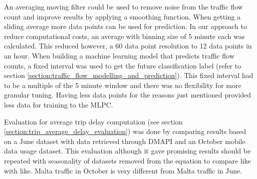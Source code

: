 \documentclass[12pt, a4paper]{report}
\theoremstyle{definition}
\theoremstyle{definition}%
\theoremstyle{definition}%
\theoremstyle{definition}%
\theoremstyle{definition}%
\theoremstyle{definition}%
\begin{document}
An averaging moving filter could be used to remove noise from the traffic flow count and improve results by applying a smoothing function. When getting a sliding average more data points can be used for prediction. In our approach to reduce computational costs, an average with binning size of 5 minute each was calculated. This reduced however, a 60 data point resolution to 12 data points in an hour. When building a machine learning model that predicts traffic flow counts, a fixed interval was used to get the future classification label (refer to section \ref{section:traffic_flow_modelling_and_prediction}). This fixed interval had to be a multiple of the 5 minute window and there was no flexibility for more granular tuning. Having less data points for the reasons just mentioned provided less data for training to the MLPC.


Evaluation for average trip delay computation (see section \ref{section:trip_average_delay_evaluation}) was done by comparing results based on a June dataset with data retrieved through DMAPI and an October mobile data usage dataset. This evaluation although it gave promising results should be repeated with seasonality of datasets removed from the equation to compare like with like. Malta traffic in October is very different from Malta traffic in June. 






\bibliomatter




 
\end{document}
